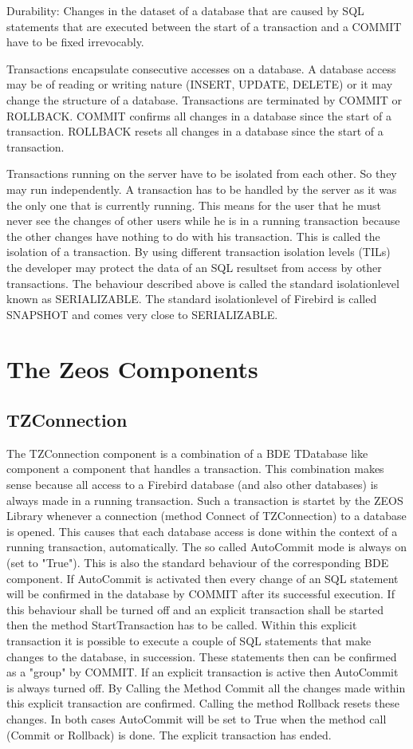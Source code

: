 \documentclass[a4paper,12pt,oneside]{book}
\begin{document}
Durability: Changes in the dataset of a database that are caused by SQL statements that are executed between the start of a transaction and a COMMIT have to be fixed irrevocably.

Transactions encapsulate consecutive accesses on a database.
A database access may be of reading or writing nature (INSERT, UPDATE, DELETE) or it may change the structure of a database.
Transactions are terminated by COMMIT or ROLLBACK.
COMMIT confirms all changes in a database since the start of a transaction.
ROLLBACK resets all changes in a database since the start of a transaction.

Transactions running on the server have to be isolated from each other.
So they may run independently.
A transaction has to be handled by the server as it was the only one that is currently running.
This means for the user that he must never see the changes of other users while he is in a running transaction because the other changes have nothing to do with his transaction.
This is called the isolation of a transaction.
By using different transaction isolation levels (TILs) the developer may protect the data of an SQL resultset from access by other transactions.
The behaviour described above is called the standard isolationlevel known as SERIALIZABLE.
The standard isolationlevel of Firebird is called SNAPSHOT and comes very close to SERIALIZABLE.

\section{The Zeos Components}

\subsection{TZConnection}
The TZConnection component is a combination of a BDE TDatabase like component a component that
handles a transaction.
This combination makes sense because all access to a Firebird database (and also other databases) is always made in a running transaction.
Such a transaction is startet by the ZEOS Library whenever a connection (method Connect of TZConnection) to a database is opened.
This causes that each database access is done within the context of a running transaction, automatically.
The so called AutoCommit mode is always on (set to "True").
This is also the standard behaviour of the corresponding BDE component.
If AutoCommit is activated then every change of an SQL statement will be confirmed in the database by COMMIT after its successful execution.
If this behaviour shall be turned off and an explicit transaction shall be started then the method StartTransaction has to be called.
Within this explicit transaction it is possible to execute a couple of SQL statements that make changes to the database, in succession.
These statements then can be confirmed as a "group" by COMMIT.
If an explicit transaction is active then AutoCommit is always turned off.
By Calling the Method Commit all the changes made within this explicit transaction are confirmed.
Calling the method Rollback resets these changes.
In both cases AutoCommit will be set to True when the method call (Commit or Rollback) is done.
The explicit transaction has ended.
\end{document}
